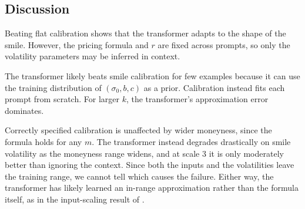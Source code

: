 \subsection{Discussion}
\vspace{-0.5em}
Beating flat calibration shows that the transformer adapts to the shape of the smile.
However, the pricing formula and $r$ are fixed across prompts, so only the volatility
parameters may be inferred in context.

The transformer likely beats smile calibration for few examples because it can use the
training distribution of $(\sigma_0, b, c)$ as a prior. Calibration instead fits each
prompt from scratch. For larger $k$, the transformer's approximation error dominates.

Correctly specified calibration is unaffected by wider moneyness, since the formula holds
for any $m$. The transformer instead degrades drastically on smile volatility as the
moneyness range widens, and at scale 3 it is only moderately better than ignoring the
context. Since both the inputs and the volatilities leave the training range, we cannot
tell which causes the failure. Either way, the transformer has likely learned an
in-range approximation rather than the formula itself, as in the input-scaling result of
\cite{garg2022what}.